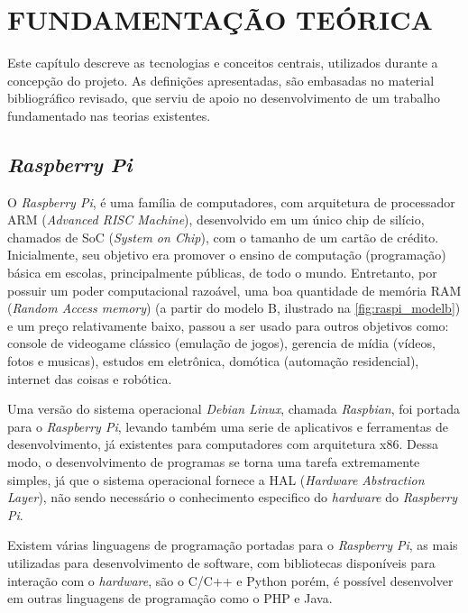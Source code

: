
\chapter{FUNDAMENTAÇÃO TEÓRICA}
\label{chap:fundamentacao-teorica}

Este capítulo descreve as tecnologias e conceitos centrais, utilizados durante a concepção do projeto. As definições apresentadas, são embasadas no material bibliográfico revisado, que serviu de apoio no desenvolvimento de um trabalho fundamentado nas teorias existentes.

\section{\textit{Raspberry Pi}}
\label{sec:raspi}

O \textit{Raspberry Pi}, é uma família de computadores, com arquitetura de processador ARM (\textit{Advanced RISC Machine}), desenvolvido em um único chip de silício, chamados de SoC (\textit{System on Chip}), com o tamanho de um cartão de crédito. Inicialmente, seu objetivo era promover o ensino de computação (programação) básica em escolas, principalmente públicas, de todo o mundo. Entretanto, por possuir um poder computacional razoável, uma boa quantidade de memória RAM (\textit{Random Access memory}) (a partir do modelo B, ilustrado na \autoref{fig:raspi_modelb}) e um preço relativamente baixo, passou a ser usado para outros objetivos como: console de videogame clássico (emulação de jogos), gerencia de mídia (vídeos, fotos e musicas), estudos em eletrônica, domótica (automação residencial), internet das coisas e robótica.  \par
Uma versão do sistema operacional \textit{Debian Linux}, chamada \textit{Raspbian}, foi portada para o \textit{Raspberry Pi}, levando também uma serie de aplicativos e ferramentas de desenvolvimento, já existentes para computadores com arquitetura x86. Dessa modo, o desenvolvimento de programas se torna uma tarefa extremamente simples, já que o sistema operacional fornece a HAL (\textit{Hardware Abstraction Layer}), não sendo necessário o conhecimento especifico do \textit{hardware} do \textit{Raspberry Pi}. \par
Existem várias linguagens de programação portadas para o \textit{Raspberry Pi}, as mais utilizadas para desenvolvimento de software, com bibliotecas disponíveis para interação com o \textit{hardware}, são o C/C++ e Python porém, é possível desenvolver em outras linguagens de programação como o PHP e Java.  \par

